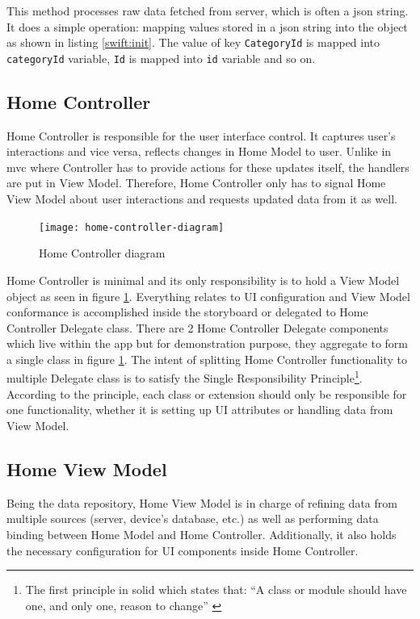 \documentclass[11pt,a4paper,oneside,article]{memoir}
\begin{document}
This method processes raw data fetched from server, which is often a \gls{json} string. It does a simple operation: mapping values stored in a \gls{json} string into the object as shown in listing \ref{swift:init}. The value of key \texttt{CategoryId} is mapped into \texttt{categoryId} variable, \texttt{Id} is mapped into \texttt{id} variable and so on.

\subsection{Home Controller}
Home Controller is responsible for the user interface control. It captures user's interactions and vice versa, reflects changes in Home Model to user. Unlike in \gls{mvc} where Controller has to provide actions for these updates itself, the handlers are put in View Model. Therefore, Home Controller only has to signal Home View Model about user interactions and requests updated data from it as well.

\begin{figure}[H]

\centering
\texttt{[image: home-controller-diagram]}

\caption{Home Controller diagram}
\label{fig:homeController}

\end{figure}

Home Controller is minimal and its only responsibility is to hold a View Model object as seen in figure \ref{fig:homeController}. Everything relates to UI configuration and View Model conformance is accomplished inside the \gls{storyboard} or delegated to Home Controller Delegate class. There are 2 Home Controller Delegate components which live within the app but for demonstration purpose, they aggregate to form a single class in figure \ref{fig:homeController}. The intent of splitting Home Controller functionality to multiple Delegate class is to satisfy the Single Responsibility Principle\footnote{The first principle in \gls{solid} which states that: ``A class or module should have one, and only one, reason to change'' \cite{unclebob:agile}}. 
According to the principle, each class or extension should only be responsible for one functionality, whether it is setting up UI attributes or handling data from View Model. 

\subsection{Home View Model}
Being the data \gls{repository}, Home View Model is in charge of refining data from multiple sources (server, device's database, etc.) as well as performing data binding between Home Model and Home Controller. Additionally, it also holds the necessary configuration for UI components inside Home Controller.
\end{document}
